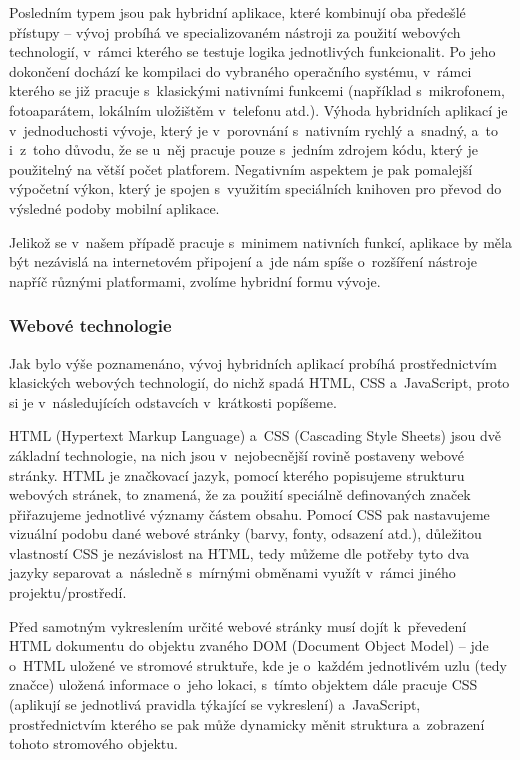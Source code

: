 Posledním typem jsou pak hybridní aplikace, které kombinují oba předešlé
přístupy -- vývoj probíhá ve specializovaném nástroji za použití
webových technologií, v~rámci kterého se testuje logika jednotlivých
funkcionalit. Po jeho dokončení dochází ke kompilaci do vybraného
operačního systému, v~rámci kterého se již pracuje s~klasickými
nativními funkcemi (například s~mikrofonem, fotoaparátem, lokálním
uložištěm v~telefonu atd.). Výhoda hybridních aplikací je
v~jednoduchosti vývoje, který je v~porovnání s~nativním rychlý a~snadný,
a~to i~z~toho důvodu, že se u~něj pracuje pouze s~jedním zdrojem kódu,
který je použitelný na větší počet platforem. Negativním aspektem je pak
pomalejší výpočetní výkon, který je spojen s~využitím speciálních
knihoven pro převod do výsledné podoby mobilní aplikace.

Jelikož se v~našem případě pracuje s~minimem nativních funkcí, aplikace
by měla být nezávislá na internetovém připojení a~jde nám spíše
o~rozšíření nástroje napříč různými platformami, zvolíme hybridní formu
vývoje.

\hypertarget{webovuxe9-technologie}{%
\subsubsection{Webové technologie}\label{webovuxe9-technologie}}

Jak bylo výše poznamenáno, vývoj hybridních aplikací probíhá
prostřednictvím klasických webových technologií, do nichž spadá HTML,
CSS a~JavaScript, proto si je v~následujících odstavcích v~krátkosti
popíšeme.

HTML (Hypertext Markup Language) a~CSS (Cascading Style Sheets) jsou dvě
základní technologie, na nich jsou v~nejobecnější rovině postaveny
webové stránky. HTML je značkovací jazyk, pomocí kterého popisujeme
strukturu webových stránek, to znamená, že za použití speciálně
definovaných značek přiřazujeme jednotlivé významy částem obsahu. Pomocí
CSS pak nastavujeme vizuální podobu dané webové stránky (barvy, fonty,
odsazení atd.), důležitou vlastností CSS je nezávislost na HTML, tedy
můžeme dle potřeby tyto dva jazyky separovat a~následně s~mírnými
obměnami využít v~rámci jiného projektu/prostředí.~\parencite{htmlcss}

Před samotným vykreslením určité webové stránky musí dojít k~převedení
HTML dokumentu do objektu zvaného DOM (Document Object Model) -- jde
o~HTML uložené ve stromové struktuře, kde je o~každém jednotlivém uzlu
(tedy značce) uložená informace o~jeho lokaci, s~tímto objektem dále
pracuje CSS (aplikují se jednotlivá pravidla týkající se vykreslení)
a~JavaScript, prostřednictvím kterého se pak může dynamicky měnit
struktura a~zobrazení tohoto stromového objektu.
\parencite{howbrowserswork}

